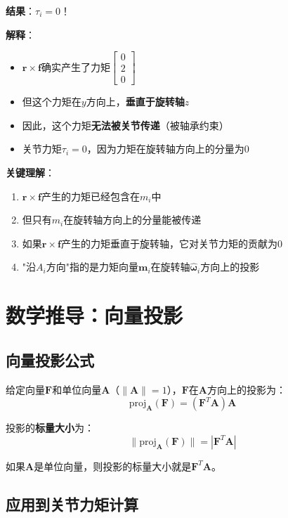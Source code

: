 \documentclass[12pt,a4paper]{article}
\begin{document}
\textbf{结果}：$\tau_i = 0$！

\textbf{解释}：
\begin{itemize}
\item $\bm{r} \times \bm{f}$确实产生了力矩$\begin{bmatrix} 0 \\ 2 \\ 0 \end{bmatrix}$
\item 但这个力矩在$y$方向上，\textbf{垂直于旋转轴$z$}
\item 因此，这个力矩\textbf{无法被关节传递}（被轴承约束）
\item 关节力矩$\tau_i = 0$，因为力矩在旋转轴方向上的分量为$0$
\end{itemize}

\textbf{关键理解}：
\begin{enumerate}
\item $\bm{r} \times \bm{f}$产生的力矩已经包含在$m_i$中
\item 但只有$m_i$在旋转轴方向上的分量能被传递
\item 如果$\bm{r} \times \bm{f}$产生的力矩垂直于旋转轴，它对关节力矩的贡献为$0$
\item "沿$A_i$方向"指的是力矩向量$\bm{m}_i$在旋转轴$\hat{\bm{\omega}}_i$方向上的投影
\end{enumerate}

\section{数学推导：向量投影}

\subsection{向量投影公式}

给定向量$\bm{F}$和单位向量$\bm{A}$（$\|\bm{A}\| = 1$），$\bm{F}$在$\bm{A}$方向上的投影为：
\begin{equation}
\text{proj}_{\bm{A}}(\bm{F}) = (\bm{F}^T \bm{A}) \bm{A}
\end{equation}

投影的\textbf{标量大小}为：
\begin{equation}
\|\text{proj}_{\bm{A}}(\bm{F})\| = |\bm{F}^T \bm{A}|
\end{equation}

如果$\bm{A}$是单位向量，则投影的标量大小就是$\bm{F}^T \bm{A}$。

\subsection{应用到关节力矩计算}
\end{document}
